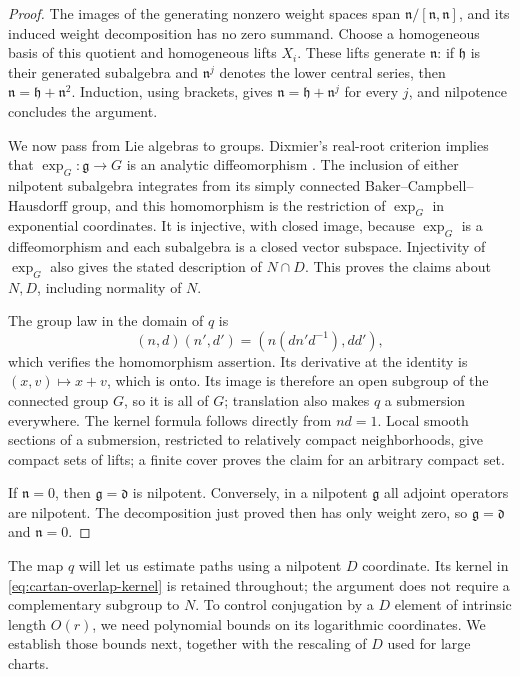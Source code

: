 \begin{proof}
The images of the generating nonzero weight spaces span
$\mathfrak n/[\mathfrak n,\mathfrak n]$, and its induced weight
decomposition has no zero summand.  Choose a homogeneous basis of this
quotient and homogeneous lifts $X_i$.  These lifts generate
$\mathfrak n$: if $\mathfrak h$ is their generated subalgebra and
$\mathfrak n^j$ denotes the lower central series, then
$\mathfrak n=\mathfrak h+\mathfrak n^2$.  Induction, using brackets,
gives $\mathfrak n=\mathfrak h+\mathfrak n^j$ for every $j$, and
nilpotence concludes the argument.

We now pass from Lie algebras to groups. Dixmier's real-root criterion implies that
$\exp_G:\mathfrak g\to G$ is an analytic diffeomorphism
\cite[Theorem~3]{Dixmier1957}.  The inclusion of either nilpotent
subalgebra integrates from its simply connected Baker--Campbell--Hausdorff
group, and this homomorphism is the restriction of $\exp_G$ in
exponential coordinates.  It is injective, with closed image, because
$\exp_G$ is a diffeomorphism and each subalgebra is a closed vector
subspace.  Injectivity of $\exp_G$ also gives the stated description
of $N\cap D$.  This proves the claims about $N,D$, including normality
of $N$.

The group law in the domain of $q$ is
\[
 (n,d)(n',d')=(n(dn'd^{-1}),dd'),
\]
which verifies the homomorphism assertion.  Its derivative at the
identity is $(x,v)\mapsto x+v$, which is onto.  Its image is therefore
an open subgroup of the connected group $G$, so it is all of $G$;
translation also makes $q$ a submersion everywhere.  The kernel formula
follows directly from $nd=1$.  Local smooth sections of a submersion,
restricted to relatively compact neighborhoods, give compact sets of
lifts; a finite cover proves the claim for an arbitrary compact set.

If $\mathfrak n=0$, then $\mathfrak g=\mathfrak d$ is nilpotent.
Conversely, in a nilpotent $\mathfrak g$ all adjoint operators are
nilpotent.  The decomposition just proved then has only weight zero,
so $\mathfrak g=\mathfrak d$ and $\mathfrak n=0$.
\end{proof}

The map $q$ will let us estimate paths using a nilpotent $D$ coordinate.
Its kernel in \eqref{eq:cartan-overlap-kernel} is retained throughout;
the argument does not require a complementary subgroup to $N$.
To control conjugation by a $D$ element of intrinsic length $O(r)$,
we need polynomial bounds on its logarithmic coordinates. We establish
those bounds next, together with the rescaling of $D$ used for large charts.

